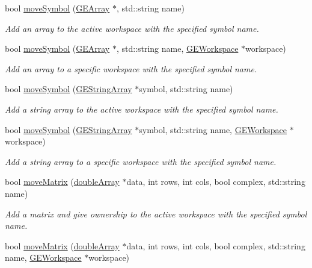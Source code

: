 \begin{DoxyCompactItemize}
bool \hyperlink{class_g_a_u_s_s_a0bf86a27d74366a93876243eafb1e0df}{move\-Symbol} (\hyperlink{class_g_e_array}{G\-E\-Array} $\ast$, std\-::string name)
\begin{DoxyCompactList}\small\item\em Add an array to the active workspace with the specified symbol name. \end{DoxyCompactList}\item 
bool \hyperlink{class_g_a_u_s_s_a8bcab9539db9c3c65cc76391f075ecf0}{move\-Symbol} (\hyperlink{class_g_e_array}{G\-E\-Array} $\ast$, std\-::string name, \hyperlink{class_g_e_workspace}{G\-E\-Workspace} $\ast$workspace)
\begin{DoxyCompactList}\small\item\em Add an array to a specific workspace with the specified symbol name. \end{DoxyCompactList}\item 
bool \hyperlink{class_g_a_u_s_s_a6f90d1a3b4fe9a4eaadc29e4df78ee6d}{move\-Symbol} (\hyperlink{class_g_e_string_array}{G\-E\-String\-Array} $\ast$symbol, std\-::string name)
\begin{DoxyCompactList}\small\item\em Add a string array to the active workspace with the specified symbol name. \end{DoxyCompactList}\item 
bool \hyperlink{class_g_a_u_s_s_aaa4c58f16202914263f59de1dcaeeb7c}{move\-Symbol} (\hyperlink{class_g_e_string_array}{G\-E\-String\-Array} $\ast$symbol, std\-::string name, \hyperlink{class_g_e_workspace}{G\-E\-Workspace} $\ast$workspace)
\begin{DoxyCompactList}\small\item\em Add a string array to a specific workspace with the specified symbol name. \end{DoxyCompactList}\item 
bool \hyperlink{class_g_a_u_s_s_ac675e89a00ca8f569f9d47abb0726d98}{move\-Matrix} (\hyperlink{classdouble_array}{double\-Array} $\ast$data, int rows, int cols, bool complex, std\-::string name)
\begin{DoxyCompactList}\small\item\em Add a matrix and give ownership to the active workspace with the specified symbol name. \end{DoxyCompactList}\item 
bool \hyperlink{class_g_a_u_s_s_a087e5cf6cda8e93eb5cb5263457edeb6}{move\-Matrix} (\hyperlink{classdouble_array}{double\-Array} $\ast$data, int rows, int cols, bool complex, std\-::string name, \hyperlink{class_g_e_workspace}{G\-E\-Workspace} $\ast$workspace)

\end{DoxyCompactItemize}
